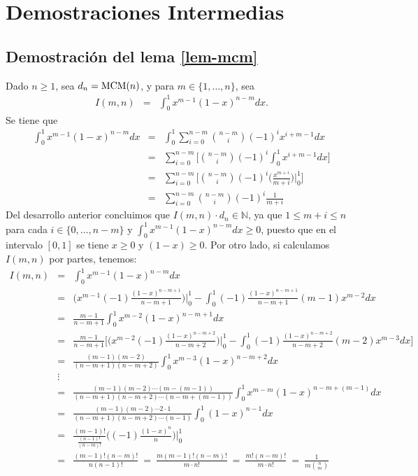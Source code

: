 \section{Demostraciones Intermedias}

\subsection{Demostración del lema \ref{lem-mcm}}
\label{app-lem-mcm}		

Dado $n \geq 1$, sea $d_n={\rm MCM}(n)$, y para $m \in \{1, \ldots, n\}$, sea  
		\begin{eqnarray*}
		I(m,n) &=& \int_{0}^{1}x^{m-1}(1-x)^{n-m}dx.
		\end{eqnarray*}
Se tiene que
		\begin{eqnarray*}
			\int_{0}^{1}x^{m-1}(1-x)^{n-m}dx  &=&
				  \int_{0}^{1}\sum_{i=0}^{n-m}{n-m\choose i}(-1)^ix^{i+m-1}dx\\
				  &=&
				  \sum_{i=0}^{n-m}\bigg[{n-m\choose i}(-1)^i \int_{0}^{1}x^{i+m-1}dx\bigg]\\
				  &=& \sum_{i=0}^{n-m}\bigg[{n-m\choose i}(-1)^i \bigg(\frac{x^{m+i}}{m+i}\bigg)\bigg\rvert_0 ^1\bigg]\\
				  &=&\sum_{i=0}^{n-m}{n-m\choose i}(-1)^i \frac{1}{m+i}
		\end{eqnarray*}
		Del desarrollo anterior concluimos que $I(m,n)\cdot d_n\in \mathbb{N}$, ya que $1 \leq m+i\leq n$ para cada $i \in \{0, \ldots, n-m\}$ y $\int_{0}^{1}x^{m-1}(1-x)^{n-m}dx \geq 0$, puesto que en el intervalo $[0,1]$ se tiene $x \geq 0$ y $(1-x) \geq 0$.
		Por otro lado, si calculamos $I(m,n)$ por partes, tenemos:	
		\begin{eqnarray*}
		I(m,n)&=&\int_{0}^{1}x^{m-1}(1-x)^{n-m}dx\\
		&=&\bigg(x^{m-1}(-1)\frac{(1-x)^{n-m+1}}{n-m+1}\bigg)\bigg\rvert_0 ^1 -\int_0^1(-1)\frac{(1-x)^{n-m+1}}{n-m+1}(m-1)x^{m-2}dx\\
		&=& \frac{m-1}{n-m+1}\int_{0}^{1}x^{m-2}(1-x)^{n-m+1}dx\\
		&=& \frac{m-1}{n-m+1}\bigg[\bigg(x^{m-2}(-1)\frac{(1-x)^{n-m+2}}{n-m+2}\bigg)\bigg\rvert_0 ^1 -\int_0^1(-1)\frac{(1-x)^{n-m+2}}{n-m+2}(m-2)x^{m-3}dx\bigg]\\
		&=& \frac{(m-1)(m-2)}{(n-m+1)(n-m+2)}\int_{0}^{1}x^{m-3}(1-x)^{n-m+2}dx\\
		& \vdots &\\
		&=& \frac{(m-1)(m-2)\cdots(m-(m-1))}{(n-m+1)(n-m+2)\cdots(n-m+(m-1))}\int_{0}^{1}x^{m-m}(1-x)^{n-m+(m-1)}dx\\
		&=& \frac{(m-1)(m-2)\cdots 2\cdot 1}{(n-m+1)(n-m+2)\cdots(n-1)}\int_{0}^{1}(1-x)^{n-1}dx\\
		&=& \frac{(m-1)!}{\frac{(n-1)!}{(n-m)!}}\bigg((-1)\frac{(1-x)^n}{n}\bigg)\bigg\rvert_0^1\\
		&= &\frac{(m-1)!(n-m)!}{n(n-1)!} \ = \ \frac{m(m-1)!(n-m)!}{m \cdot n!} \ = \ \frac{m!(n-m)!}{m\cdot n!} \ = \ \frac{1}{m{n\choose m}}
		\end{eqnarray*}
